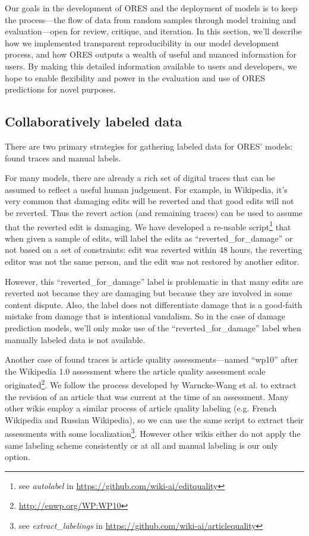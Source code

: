 Our goals in the development of ORES and the deployment of models is to keep the process---the flow of data from random samples through model training and evaluation---open for review, critique, and iteration.  In this section, we'll describe how we implemented transparent reproducibility in our model development process, and how ORES outputs a wealth of useful and nuanced information for users.  By making this detailed information available to users and developers, we hope to enable flexibility and power in the evaluation and use of ORES predictions for novel purposes.

\subsection{Collaboratively labeled data}
There are two primary strategies for gathering labeled data for ORES' models: found traces and manual labels.

 For many models, there are already a rich set of digital traces that can be assumed to reflect a useful human judgement.  For example, in Wikipedia, it's very common that damaging edits will be reverted and that good edits will not be reverted.  Thus the revert action (and remaining traces) can be used to assume that the reverted edit is damaging.  We have developed a re-usable script\footnote{see \emph{autolabel} in \url{https://github.com/wiki-ai/editquality}} that when given a sample of edits, will label the edits as ``reverted\_for\_damage'' or not based on a set of constraints: edit was reverted within 48 hours, the reverting editor was not the same person, and the edit was not restored by another editor.

However, this ``reverted\_for\_damage'' label is problematic in that many edits are reverted not because they are damaging but because they are involved in some content dispute.  Also, the label does not differentiate damage that is a good-faith mistake from damage that is intentional vandalism.  So in the case of damage prediction models, we'll only make use of the ``reverted\_for\_damage'' label when manually labeled data is not available.

Another case of found traces is article quality assessments---named ``wp10'' after the Wikipedia 1.0 assessment where the article quality assessment scale originated\footnote{\url{http://enwp.org/WP:WP10}}.  We follow the process developed by Warncke-Wang et al.\cite{wang2017english} to extract the revision of an article that was current at the time of an assessment.  Many other wikis employ a similar process of article quality labeling (e.g. French Wikipedia and Russian Wikipedia), so we can use the same script to extract their assessments with some localization\footnote{see \emph{extract\_labelings} in \url{https://github.com/wiki-ai/articlequality}}.  However other wikis either do not apply the same labeling scheme consistently or at all and manual labeling is our only option.

